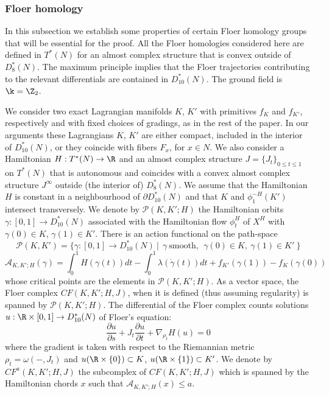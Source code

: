  
\subsubsection{Floer homology} In this subsection we establish some properties of certain Floer homology groups that will be essential for the proof. All the Floer homologies considered here are defined in $T^{\ast}(N)$ for an almost complex structure that is convex outside of $D^{\ast}_{8}(N)$.  The maximum principle implies that the Floer trajectories contributing to the relevant differentials are contained in $D^{\ast}_{10}(N)$. The ground field is $\k=\Z_{2}$.

We consider two exact Lagrangian manifolds $K$, $K'$ with primitives
$f_{K}$ and $f_{K'}$, respectively and with fixed choices of gradings, as in the rest of the paper.
In our arguments these Lagrangians $K$, $K'$
are either compact,  included in the interior of  $D^{\ast}_{10}(N)$, or they coincide with fibers $F_{x}$, for $x\in N$. We also consider a Hamiltonian $H: T^{\ast}(N)\to \R$  and an almost complex structure $J=\{J_{t}\}_{0\leq t\leq 1}$ on $T^{\ast}(N)$ that is autonomous and coincides with a convex almost complex structure $J^{\infty}$ 
outside (the interior of) $D^{\ast}_{8}(N)$. We assume that the Hamiltonian $H$ is constant in a neighbourhood of $\partial D^{\ast}_{10}(N)$ and 
that $K$ and $\phi^{-H}_{1}(K')$ intersect transversely. 
We denote by $\mathcal{P}(K,K'; H)$ the Hamiltonian orbits 
$\gamma:[0,1]\to D_{10}^{\ast}(N)$ associated with the Hamiltonian flow $\phi^{H}_{t}$ of $X^{H}$ with $\gamma(0)\in K$, $\gamma(1)\in K'$. There is an action functional on the path-space 
 $$\mathcal{P}(K,K')=\{ \gamma :[0,1]\to D_{10}^{\ast}(N) \ |\ \  \gamma \ \mathrm{smooth,}\  \ \gamma (0)\in K, \ \gamma (1)\in K' \ \}$$
\begin{equation}\label{eq:action1}
\mathcal{A}_{K,K';H}(\gamma)=\int_{0}^{1}H(\gamma(t))dt - \int_{0}^{1}\lambda(\dot{\gamma}(t))dt+f_{K'}(\gamma(1))-f_{K}(\gamma(0))\end{equation}
whose critical points are the elements in $\mathcal{P}(K,K'; H)$. 
As a vector space, the Floer complex $CF(K,K'; H,J)$, when it is defined (thus assuming regularity)
is spanned by $\mathcal{P}(K,K'; H)$.  The differential of the Floer complex counts solutions  $u: \R\times [0,1] \to D_{10}^{\ast}(N)$ of Floer's equation:
\begin{equation}\label{eq:Floer1}
\frac{\partial u}{\partial s} + J_{t} \frac{\partial u}{\partial t} +\nabla_{\rho_{t}} H(u)=0
\end{equation}
where the gradient is taken with respect to the Riemannian metric $\rho_{t}=\omega (- , J_{t})$
and $u(\R\times \{0\})\subset K$, $u(\R\times \{1\})\subset K'$.
We denote by $CF^{a}(K,K'; H,J)$ the subcomplex of $CF(K,K';H,J)$ which is spanned by the Hamiltonian chords $x$ such that $\mathcal{A}_{K,K';H}(x)\leq a$.


